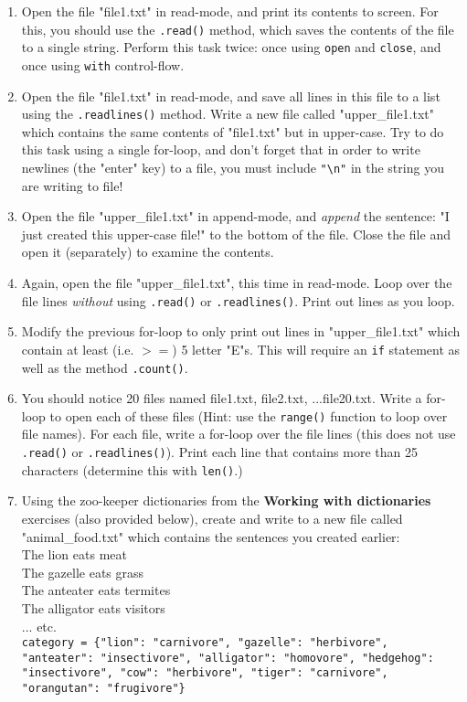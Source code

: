 \documentclass{article}[12pt]
\newcommand{\code}[1]{\texttt{#1}}  %
\begin{document}
\begin{enumerate}
	
	\item Open the file "file1.txt" in read-mode, and print its contents to screen. For this, you should use the \code{.read()} method, which saves the contents of the file to a single string. Perform this task twice: once using \code{open} and \code{close}, and once using \code{with} control-flow.
	
	\item Open the file "file1.txt" in read-mode, and save all lines in this file to a list using the \code{.readlines()} method. Write a new file called "upper\_file1.txt" which contains the same contents of "file1.txt" but in upper-case. Try to do this task using a single for-loop, and don't forget that in order to write newlines (the "enter" key) to a file, you must include \code{"\textbackslash n"} in the string you are writing to file!
	
	\item Open the file "upper\_file1.txt" in append-mode, and \emph{append} the sentence: "I just created this upper-case file!" to the bottom of the file. Close the file and open it (separately) to examine the contents. 
	
	\item Again, open the file "upper\_file1.txt", this time in read-mode. Loop over the file lines \emph{without} using \code{.read()} or \code{.readlines()}. Print out lines as you loop.
	
	\item Modify the previous for-loop to only print out lines in "upper\_file1.txt" which contain at least (i.e. $>=$) 5 letter "E"s. This will require an \code{if} statement as well as the method \code{.count()}.
	
	\item You should notice 20 files named file1.txt, file2.txt, ...file20.txt. Write a for-loop to open each of these files (Hint: use the \code{range()} function to loop over file names). For each file, write a for-loop over the file lines (this does not use \code{.read()} or \code{.readlines()}). Print each line that contains more than 25 characters (determine this with \code{len()}.)
	
	\item Using the zoo-keeper dictionaries from the \textbf{Working with dictionaries} exercises (also provided below), create and write to a new file called "animal\_food.txt" which contains the sentences you created earlier: \\
        The lion eats meat \\
        The gazelle eats grass \\ 
        The anteater eats termites \\
        The alligator eats visitors \\ 
            ... etc. \\
        \code{category = \{"lion": "carnivore", "gazelle": "herbivore", "anteater": "insectivore", "alligator": "homovore", "hedgehog": "insectivore", "cow": "herbivore", "tiger": "carnivore", "orangutan": "frugivore"\}} \\
	

\end{enumerate}
\end{document}
